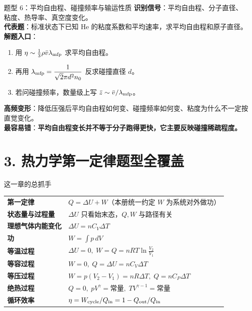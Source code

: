 \documentclass[11pt,a4paper]{ctexart}
\newcommand{\warn}[1]{\textcolor{red!70!black}{\textbf{#1}}}
\begin{document}
\begin{typebox}{题型 6：平均自由程、碰撞频率与输运性质}
\textbf{识别信号}：平均自由程、分子直径、粘度、热导率、真空度变化。\\
\textbf{代表题}：标准状态下已知 He 的粘度系数和平均速率，求平均自由程和原子直径。\\
\textbf{解题入口}：
\begin{enumerate}
  \item 用 \(\eta\sim \frac13 \rho\bar v\lambda_{\rm mfp}\) 求平均自由程。
  \item 再用 \(\lambda_{\rm mfp}=\dfrac{1}{\sqrt2\pi d^2 n_0}\) 反求碰撞直径 \(d\)。
  \item 若问碰撞频率，数量级上写 \(\bar z\sim \bar v/\lambda_{\rm mfp}\)。
\end{enumerate}
\textbf{高频变形}：降低压强后平均自由程如何变、碰撞频率如何变、粘度为什么不一定按直觉变化。\\
\textbf{最容易错}：\warn{平均自由程变长并不等于分子跑得更快，它主要反映碰撞稀疏程度。}
\end{typebox}

\section*{3. 热力学第一定律题型全覆盖}

\begin{introbox}{这一章的总抓手}
\begin{tabularx}{\textwidth}{>{\bfseries}p{4.0cm}X}
第一定律 & \(Q=\Delta U+W\)（本册统一约定 \(W\) 为系统对外做功）\\[2pt]
状态量与过程量 & \(\Delta U\) 只看始末态，\(Q,W\) 与路径有关\\[2pt]
理想气体内能变化 & \(\Delta U=nC_V\Delta T\)\\[2pt]
功 & \(W=\int p\,dV\)\\[2pt]
等温过程 & \(\Delta U=0,\;W=Q=nRT\ln\frac{V_2}{V_1}\)\\[2pt]
等容过程 & \(W=0,\;Q=\Delta U=nC_V\Delta T\)\\[2pt]
等压过程 & \(W=p(V_2-V_1)=nR\Delta T,\;Q=nC_P\Delta T\)\\[2pt]
绝热过程 & \(Q=0,\;pV^\gamma=\text{常量},\;TV^{\gamma-1}=\text{常量}\)\\[2pt]
循环效率 & \(\eta=W_{\rm cycle}/Q_{\rm in}=1-Q_{\rm out}/Q_{\rm in}\)
\end{tabularx}
\end{introbox}
\end{document}
